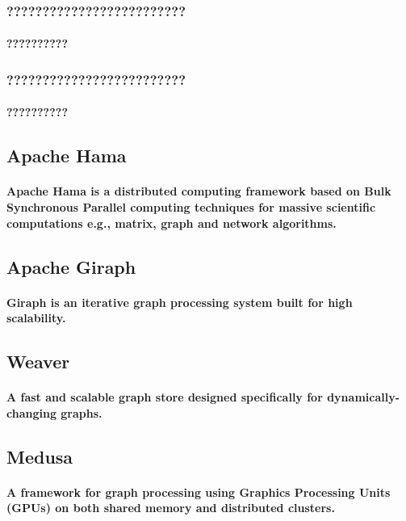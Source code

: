 \documentclass{acm_proc_article-sp}
\begin{document}
\subsubsection{?????????????????????????}
\paragraph{??????????}
\subsubsection{?????????????????????????}
\paragraph{??????????}
\subsection{Apache Hama}
\paragraph{Apache Hama is a distributed computing framework based on Bulk Synchronous Parallel computing techniques for massive scientific computations e.g., matrix, graph and network algorithms.\cite{seo2010hama}}
\subsection{Apache Giraph}
\paragraph{Giraph is an iterative graph processing system built for high scalability.\cite{ching2013scaling}}
\subsection{Weaver}
\paragraph{A fast and scalable graph store designed specifically for dynamically-changing graphs.\cite{wu2012kernel}}
\subsection{Medusa}
\paragraph{A framework for graph processing using Graphics Processing Units (GPUs) on both shared memory and distributed clusters.\cite{zhong2014medusa}}
\end{document}

